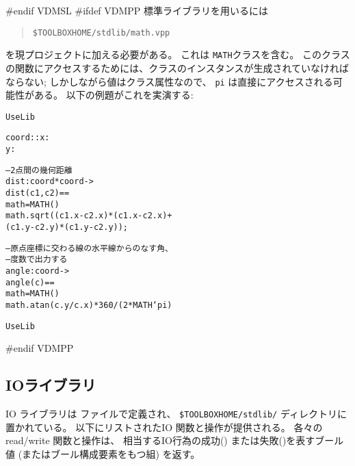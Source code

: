\documentclass[\pformat,12pt]{jarticle}
\begin{document}
#endif VDMSL
#ifdef VDMPP
標準ライブラリを用いるには
\begin{quote}
\verb+$TOOLBOXHOME/stdlib/math.vpp+
\end{quote}
を現プロジェクトに加える必要がある。
これは \texttt{MATH}クラスを含む。
このクラスの関数にアクセスするためには、クラスのインスタンスが生成されていなければならない; 
しかしながら値はクラス属性なので、 \texttt{pi} は直接にアクセスされる可能性がある。
以下の例題がこれを実演する:
\begin{alltt}
 UseLib



  coord :: x : 
           y : 


  -- 2点間の幾何距離
  dist : coord * coord -> 
  dist (c1,c2) ==
     math =  MATH()
    math.sqrt((c1.x - c2.x) * (c1.x - c2.x) +
              (c1.y - c2.y) * (c1.y - c2.y));


  -- 原点座標に交わる線の水平線からのなす角、
 -- 度数で出力する
  angle : coord -> 
  angle (c) ==
     math =  MATH()
    math.atan (c.y / c.x) * 360 / ( 2 * MATH`pi)

 UseLib
\end{alltt}
#endif VDMPP

\subsection{IOライブラリ}

 IO ライブラリは ファイルで定義され、 \verb+$TOOLBOXHOME/stdlib/+ ディレクトリに置かれている。
以下にリストされたIO 関数と操作が提供される。
各々の read/write 関数と操作は、 相当するIO行為の成功() または失敗()を表すブール値 (またはブール構成要素をもつ組) を返す。
\end{document}
